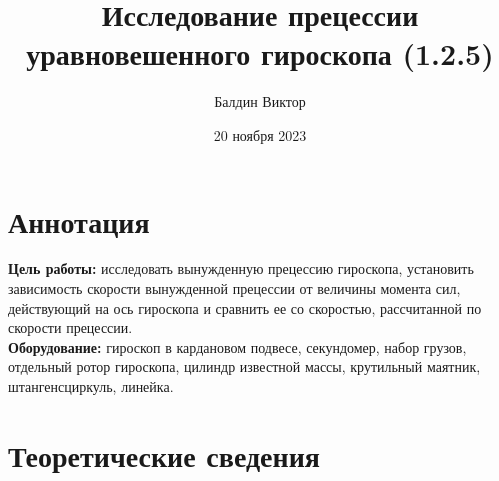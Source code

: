 \documentclass[a4paper,12pt]{article}
\title{\textbf{Исследование прецессии уравновешенного гироскопа (1.2.5)}}
\author{Балдин Виктор}
\date{20 ноября 2023}
\begin{document}
	\maketitle

	\section{Аннотация}

	\textbf{Цель работы:} исследовать вынужденную прецессию гироскопа, установить зависимость скорости вынужденной прецессии от величины момента сил, действующий на ось гироскопа и сравнить ее со скоростью, рассчитанной по скорости прецессии.\\
	\textbf{Оборудование:} гироскоп в кардановом подвесе, секундомер, набор грузов, отдельный ротор гироскопа, цилиндр известной массы, крутильный маятник, штангенсциркуль, линейка.

	\section{Теоретические сведения}
\end{document}
